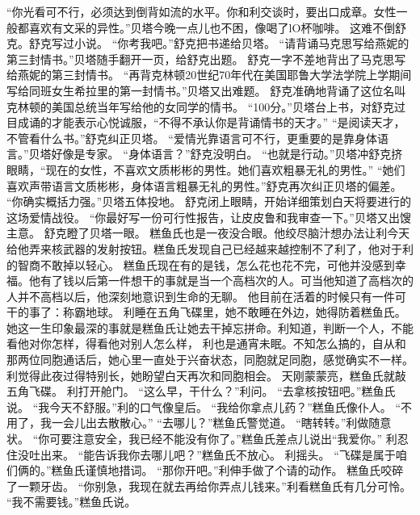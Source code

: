 \documentclass[a4paper,12pt,UTF8,twoside]{ctexbook}
\begin{document}
        “你光看可不行，必须达到倒背如流的水平。你和利交谈时，要出口成章。女性一般都喜欢有文采的异性。”贝塔今晚一点儿也不困，像喝了lO杯咖啡。 
        这难不倒舒克。舒克写过小说。 
        “你考我吧。”舒克把书递给贝塔。 
        “请背诵马克思写给燕妮的第三封情书。”贝塔随手翻开一页，给舒克出题。 
        舒克一字不差地背出了马克思写给燕妮的第三封情书。 
        “再背克林顿20世纪70年代在美国耶鲁大学法学院上学期间写给同班女生希拉里的第一封情书。”贝塔又出难题。 
        舒克准确地背诵了这位名叫克林顿的美国总统当年写给他的女同学的情书。 
        “100分。”贝塔台上书，对舒克过目成诵的才能表示心悦诚服，“不得不承认你是背诵情书的天才。” 
        “是阅读天才，不管看什么书。”舒克纠正贝塔。 
        “爱情光靠语言可不行，更重要的是靠身体语言。”贝塔好像是专家。 
        “身体语言？”舒克没明白。 
        “也就是行动。”贝塔冲舒克挤眼睛，“现在的女性，不喜欢文质彬彬的男性。她们喜欢粗暴无礼的男性。” 
        “她们喜欢声带语言文质彬彬，身体语言粗暴无礼的男性。”舒克再次纠正贝塔的偏差。 
        “你确实概括力强。”贝塔五体投地。 
        舒克闭上眼睛，开始详细策划白天将要进行的这场爱情战役。 
        “你最好写一份可行性报告，让皮皮鲁和我审查一下。”贝塔又出馊主意。 
        舒克瞪了贝塔一眼。 
        糕鱼氏也是一夜没合眼。他绞尽脑汁想办法让利今天给他弄来核武器的发射按钮。糕鱼氏发现自己已经越来越控制不了利了，他对于利的智商不敢掉以轻心。 
        糕鱼氏现在有的是钱，怎么花也花不完，可他并没感到幸福。他有了钱以后第一件想干的事就是当一个高档次的人。可当他知道了高档次的人并不高档以后，他深刻地意识到生命的无聊。 
        他目前在活着的时候只有一件可干的事了：称霸地球。 
        利睡在五角飞碟里，她不敢睡在外边，她得防着糕鱼氏。她这一生印象最深的事就是糕鱼氏让她去干掉忘拼命。利知道，判断一个人，不能看他对你怎样，得看他对别人怎么样， 
        利也是通宵未眠。不知怎么搞的，自从和那两位同胞通话后，她心里一直处于兴奋状态，同胞就足同胞，感觉确实不一样。 
        利觉得此夜过得特别长，她盼望白天再次和同胞相会。 
        天刚蒙蒙亮，糕鱼氏就敲五角飞碟。 
        利打开舱门。 
        “这么早，干什么？”利问。 
        “去拿核按钮吧。”糕鱼氏说。 
        “我今天不舒服。”利的口气像皇后。 
        “我给你拿点儿药？”糕鱼氏像仆人。 
        “不用了，我一会儿出去散散心。” 
        “去哪儿？”糕鱼氏警觉道。 
        “瞎转转。”利做随意状。 
        “你可要注意安全，我已经不能没有你了。”糕鱼氏差点儿说出“我爱你。” 
        利忍住没吐出来。 
        “能告诉我你去哪儿吧？”糕鱼氏不放心。 
        利摇头。 
        “飞碟是属于咱们俩的。”糕鱼氏谨慎地措词。 
        “那你开吧。”利伸手做了个请的动作。 
        糕鱼氏咬碎了一颗牙齿。 
        “你别急，我现在就去再给你弄点儿钱来。”利看糕鱼氏有几分可怜。 
        “我不需要钱。”糕鱼氏说。 
\end{document}
